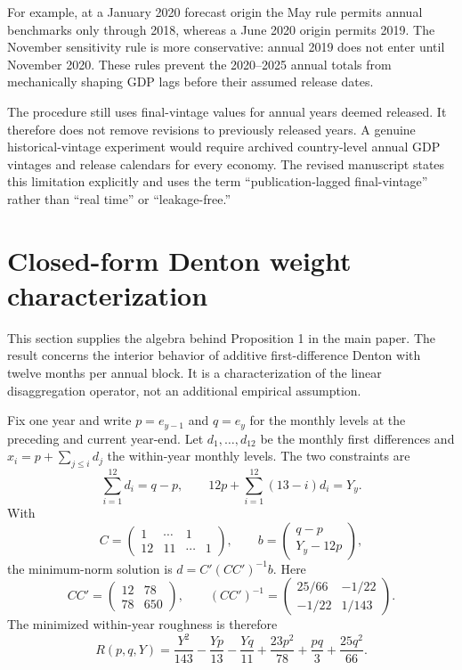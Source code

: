 \documentclass[preprint,12pt,authoryear]{elsarticle}
\begin{document}
For example, at a January 2020 forecast origin the May rule permits annual benchmarks only through 2018, whereas a June 2020 origin permits 2019. The November sensitivity rule is more conservative: annual 2019 does not enter until November 2020. These rules prevent the 2020--2025 annual totals from mechanically shaping GDP lags before their assumed release dates.

The procedure still uses final-vintage values for annual years deemed released. It therefore does not remove revisions to previously released years. A genuine historical-vintage experiment would require archived country-level annual GDP vintages and release calendars for every economy. The revised manuscript states this limitation explicitly and uses the term ``publication-lagged final-vintage'' rather than ``real time'' or ``leakage-free.''


\section{Closed-form Denton weight characterization}
This section supplies the algebra behind Proposition 1 in the main paper. The result concerns the interior behavior of additive first-difference Denton with twelve months per annual block. It is a characterization of the linear disaggregation operator, not an additional empirical assumption.

Fix one year and write $p=e_{y-1}$ and $q=e_y$ for the monthly levels at the preceding and current year-end. Let $d_1,\ldots,d_{12}$ be the monthly first differences and $x_i=p+\sum_{j\leq i}d_j$ the within-year monthly levels. The two constraints are
\[
\sum_{i=1}^{12}d_i=q-p,
\qquad
12p+\sum_{i=1}^{12}(13-i)d_i=Y_y.
\]
With
\[
C=\begin{pmatrix}
1&\cdots&1\\
12&11&\cdots&1
\end{pmatrix},
\qquad
b=\begin{pmatrix}q-p\\Y_y-12p\end{pmatrix},
\]
the minimum-norm solution is $d=C'(CC')^{-1}b$. Here
\[
CC'=\begin{pmatrix}12&78\\78&650\end{pmatrix},
\qquad
(CC')^{-1}=\begin{pmatrix}25/66&-1/22\\-1/22&1/143\end{pmatrix}.
\]
The minimized within-year roughness is therefore
\begin{equation}
R(p,q,Y)
=\frac{Y^2}{143}-\frac{Yp}{13}-\frac{Yq}{11}
 +\frac{23p^2}{78}+\frac{pq}{3}+\frac{25q^2}{66}.
\label{eq:s_R}
\end{equation}
\end{document}
